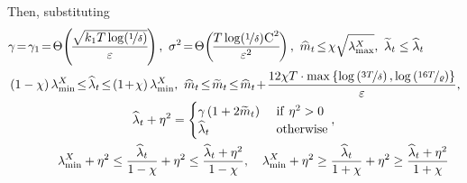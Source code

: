 \documentclass[11pt]{article}
\theoremstyle{definition}
\theoremstyle{plain}
\newcommand{\eps}{{\varepsilon}}
\renewcommand{\eps}{\varepsilon}
\begin{document}
Then, substituting
\begin{align}
    &\gamma \hspace{-0.15em}=\hspace{-0.15em}\gamma_1 \hspace{-0.15em}=\hspace{-0.15em} \Theta\hspace{-0.15em}\left(\hspace{-0.15em}\frac{\sqrt{k_1T\log(\nicefrac{1}{\delta})}}{\eps}\hspace{-0.15em}\right), \ \sigma^2 \hspace{-0.15em}=\hspace{-0.15em} \Theta\hspace{-0.15em}\left(\hspace{-0.15em}\frac{T\log(\nicefrac{1}{\delta})\textsc{C}^2}{\eps^2}\hspace{-0.15em}\right), \ \widehat{m}_t \hspace{-0.15em}\leq\hspace{-0.15em} \chi\sqrt{\lambda^{X}_{\max}}, \ \widetilde{\lambda}_t \leq \widehat{\lambda}_t\\
    &\left(1 - \chi\right)\lambda^{X}_{\min} \hspace{-0.15em}\leq\hspace{-0.15em} \widehat{\lambda}_t \hspace{-0.15em}\leq\hspace{-0.15em} \left(1 \hspace{-0.15em}+\hspace{-0.15em} \chi\right)\lambda^{X}_{\min}, \ \widehat{m}_t \hspace{-0.15em}\leq\hspace{-0.15em} \widetilde{m}_t \hspace{-0.15em}\leq\hspace{-0.15em} \widehat{m}_t \hspace{-0.15em}+\hspace{-0.15em} \frac{12\chi T\cdot \max\left\{\log\left(\nicefrac{3T}{\delta}\right), \log\left(\nicefrac{16T}{\varrho}\right)\right\}}{\eps}, \\ 
    &\qquad\qquad\qquad\qquad\qquad \widehat{\lambda}_t + \eta^2 = \begin{cases}
        \gamma\left(1 + 2\widetilde{m}_t\right) \ &\mathrm{if} \ \eta^2 > 0\\ 
        \widehat{\lambda}_t \ &\mathrm{otherwise}
    \end{cases}, \\ 
    &\qquad\qquad \lambda^{X}_{\min} + \eta^2 \leq \frac{\widehat{\lambda}_t}{1 - \chi} + \eta^2 \leq \frac{\widehat{\lambda}_t + \eta^2}{1 - \chi}, \ \ \ \lambda^{X}_{\min} + \eta^2 \geq \frac{\widehat{\lambda}_t}{1 + \chi} + \eta^2 \geq \frac{\widehat{\lambda}_t + \eta^2}{1 + \chi}
\end{align}
\end{document}
